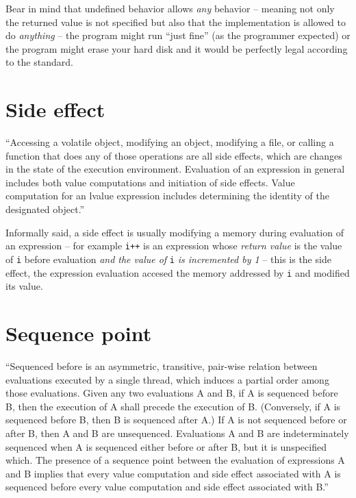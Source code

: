Bear in mind that undefined behavior allows \emph{any} behavior -- meaning not only the returned value is not specified but also that the implementation is allowed to do \emph{anything} -- the program might run ``just fine'' (as the programmer expected) or the program might erase your hard disk and it would be perfectly legal according to the standard.

\section{Side effect}
``Accessing a volatile object, modifying an object, modifying a file, or calling a function that does any of those operations are all side effects, which are changes in the state of the execution environment. Evaluation of an expression in general includes both value computations and initiation of side effects. Value computation for an lvalue expression includes determining the identity of the designated object.''\cite{WG14N1570}

Informally said, a side effect is usually modifying a memory during evaluation of an expression -- for example \verb|i++| is an expression whose \emph{return value} is the value of \verb|i| before evaluation \emph{and the value of }\verb|i|\emph{ is incremented by 1} -- this is the side effect, the expression evaluation accesed the memory addressed by \verb|i| and modified its value.

\section{Sequence point}
``Sequenced before is an asymmetric, transitive, pair-wise relation between evaluations
executed by a single thread, which induces a partial order among those evaluations.
Given any two evaluations A and B, if A is sequenced before B, then the execution of A
shall precede the execution of B. (Conversely, if A is sequenced before B, then B is
sequenced after A.) If A is not sequenced before or after B, then A and B are
unsequenced. Evaluations A and B are indeterminately sequenced when A is sequenced
either before or after B, but it is unspecified which. The presence of a sequence point
 between the evaluation of expressions A and B implies that every value computation and
side effect associated with A is sequenced before every value computation and side effect
associated with B.''\cite{WG14N1570}

